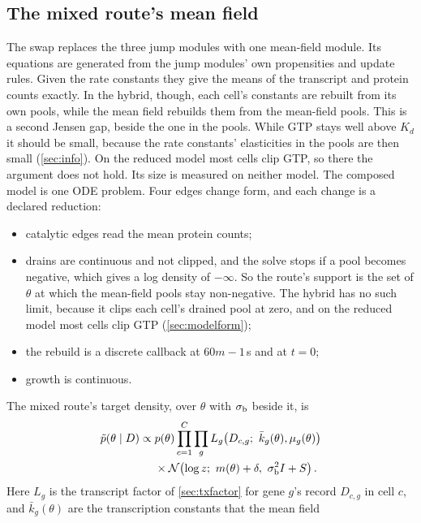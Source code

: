 \subsection{The mixed route's mean field}
\label{sec:meanfield}

The swap replaces the three jump modules with one mean-field module. Its equations
are generated from the jump modules' own propensities and update rules. Given the rate
constants they give the means of the transcript and protein counts exactly. In the
hybrid, though, each cell's constants are rebuilt from its own pools, while the mean
field rebuilds them from the mean-field pools. This is a second Jensen gap, beside the
one in the pools. While GTP stays well above $K_d$ it should be small, because the rate
constants' elasticities in the pools are then small (\cref{sec:info}). On the reduced model
most cells clip GTP, so there the argument does not hold. Its size is measured on neither model. The composed
model is one ODE problem. Four edges change form, and each change is a declared
reduction:
\begin{itemize}
  \item catalytic edges read the mean protein counts;
  \item drains are continuous and not clipped, and the solve stops if a pool becomes
  negative, which gives a log density of $-\infty$. So the route's support is the set of
  $\theta$ at which the mean-field pools stay non-negative. The hybrid has no such limit,
  because it clips each cell's drained pool at zero, and on the reduced model most cells
  clip GTP (\cref{sec:modelform});
  \item the rebuild is a discrete callback at $60m - 1$\,s and at $t = 0$;
  \item growth is continuous.
\end{itemize}
The mixed route's target density, over $\theta$ with $\sigma_{\mathrm{b}}$ beside it, is
\begin{equation}
\label{eq:mixed}
\begin{aligned}
\tilde p(\theta \mid D) \propto{}& p(\theta) \prod_{c=1}^{C} \prod_{g}
  L_{g}\!\left(D_{c,g};\ \bar{k}_g(\theta), \mu_g(\theta)\right) \\
&\times \mathcal{N}\!\left(\log z;\ m(\theta) + \delta,\ \sigma_{\mathrm{b}}^2 I + S\right) .
\end{aligned}
\end{equation}
Here $L_g$ is the transcript factor of \cref{sec:txfactor} for gene $g$'s record $D_{c,g}$
in cell $c$, and $\bar{k}_g(\theta)$ are the transcription constants that the mean field
